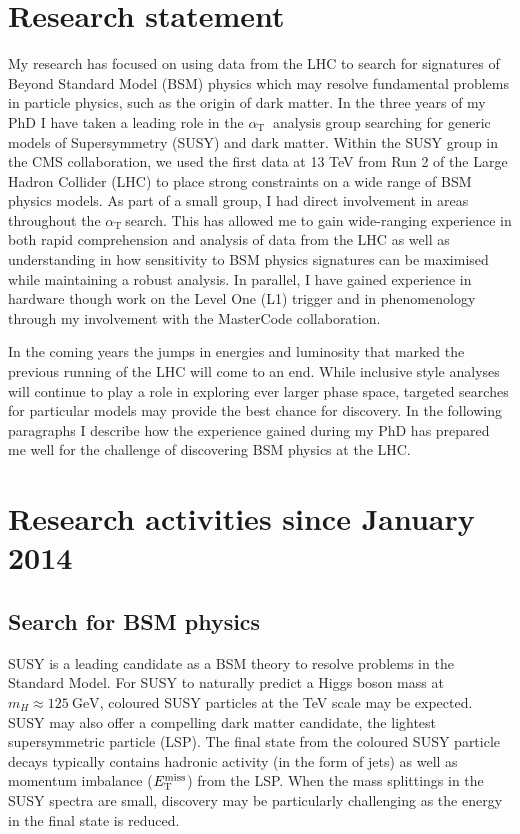 \documentclass[11pt]{article}
\theoremstyle{plain} \numberwithin{equation}{section}
\theoremstyle{definition}
\DeclareRobustCommand{\alphat}{$\alpha_{\text{T}}~$}
\DeclareRobustCommand{\met}{$\mbox{$E_\text{T}^{\rm miss}$}\xspace$}
\begin{document}
\section*{Research statement}
\noindent 
My research has focused on using data from the LHC to search for signatures of Beyond Standard Model (BSM) physics which may resolve 
fundamental problems in particle physics, such as the origin of dark matter. 
In the three years of my PhD I have taken a leading role in the \alphat 
analysis group searching for generic models of Supersymmetry (SUSY) and dark matter. 
Within the SUSY group in the CMS collaboration, we used the first data at 13 TeV from Run 2 of the 
Large Hadron Collider (LHC) to place strong constraints on a wide range of BSM physics models. 
As part of a small group, I had direct involvement in areas throughout the \alphat search. 
This has allowed me to gain wide-ranging experience in both rapid comprehension
and analysis of data from the LHC as well as understanding in how sensitivity to BSM physics signatures can be maximised
while maintaining a robust analysis. In parallel, I have gained experience in hardware though work on the 
Level One (L1) trigger and in phenomenology through my involvement with the MasterCode collaboration.

In the coming years the jumps in energies and luminosity that marked the previous running of the 
LHC will come to an end. While inclusive style analyses will continue to play a role in 
exploring ever larger phase space, targeted searches for particular models 
may provide the best chance for discovery. In the following paragraphs I describe how the experience 
gained during my PhD has prepared me well for the challenge of discovering BSM physics at the LHC.

\section*{Research activities since January 2014}

\subsection*{Search for BSM physics}

SUSY is a leading candidate as a BSM theory to resolve problems in the Standard Model.
For SUSY to naturally predict a Higgs boson mass at $m_H \approx 125~\text{GeV}$, coloured 
SUSY particles at the TeV scale may be expected. SUSY may also offer a compelling dark matter
candidate, the lightest supersymmetric particle (LSP). The final state from the coloured SUSY 
particle decays typically contains hadronic activity (in the form of jets) as well as momentum 
imbalance (\met) from the LSP. When the mass splittings in the SUSY spectra are small, 
discovery may be particularly challenging as the energy in the final state is reduced.
\end{document}
